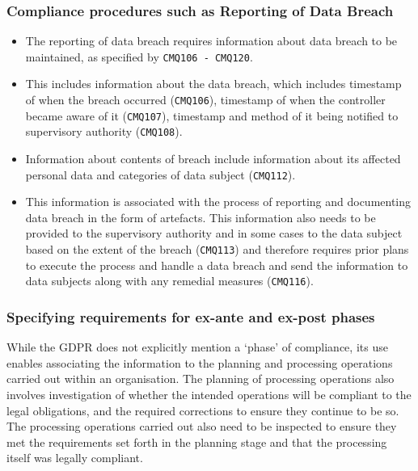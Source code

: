 \subsubsection{Compliance procedures such as Reporting of Data Breach}
\begin{itemize}
    \item The reporting of data breach requires information about data breach to be maintained, as specified by \texttt{CMQ106 - CMQ120}.
    \item This includes information about the data breach, which includes timestamp of when the breach occurred (\texttt{CMQ106}), timestamp of when the controller became aware of it (\texttt{CMQ107}), timestamp and method of it being notified to supervisory authority (\texttt{CMQ108}).
    \item Information about contents of breach include information about its affected personal data and categories of data subject (\texttt{CMQ112}).
    \item This information is associated with the process of reporting and documenting data breach in the form of artefacts. This information also needs to be provided to the supervisory authority and in some cases to the data subject based on the extent of the breach (\texttt{CMQ113}) and therefore requires prior plans to execute the process and handle a data breach and send the information to data subjects along with any remedial measures (\texttt{CMQ116}).
\end{itemize}

\subsubsection{Specifying requirements for ex-ante and ex-post phases}
While the GDPR does not explicitly mention a `phase' of compliance, its use enables associating the information to the planning and processing operations carried out within an organisation. The planning of processing operations also involves investigation of whether the intended operations will be compliant to the legal obligations, and the required corrections to ensure they continue to be so. The processing operations carried out also need to be inspected to ensure they met the requirements set forth in the planning stage and that the processing itself was legally compliant.


